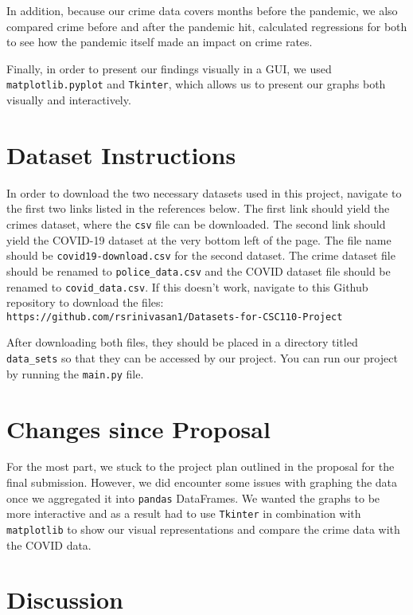 \documentclass[fontsize=11pt]{article}
\begin{document}
In addition, because our crime data covers months before the pandemic, we also compared crime before and after the pandemic hit, calculated regressions for both to see how the pandemic itself made an impact on crime rates.

Finally, in order to present our findings visually in a GUI, we used \verb+matplotlib.pyplot+ and \verb+Tkinter+, which allows us to present our graphs both visually and interactively.

\section{Dataset Instructions}

In order to download the two necessary datasets used in this project, navigate to the first two links listed in the references below. The first link should yield the crimes dataset, where the \verb+csv+ file can be downloaded. The second link should yield the COVID-19 dataset at the very bottom left of the page. The file name should be \verb+covid19-download.csv+ for the second dataset. The crime dataset file should be renamed to \verb+police_data.csv+ and the COVID dataset file should be renamed to \verb+covid_data.csv+. If this doesn’t work, navigate to this Github repository to download the files:\\ \verb+https://github.com/rsrinivasan1/Datasets-for-CSC110-Project+

After downloading both files, they should be placed in a directory titled \verb+data_sets+ so that they can be accessed by our project. You can run our project by running the \verb+main.py+ file.

\section{Changes since Proposal}
For the most part, we stuck to the project plan outlined in the proposal for the final submission. However, we did encounter some issues with graphing the data once we aggregated it into \verb+pandas+ DataFrames. We wanted the graphs to be more interactive and as a result had to use \verb+Tkinter+ in combination with \verb+matplotlib+ to show our visual representations and compare the crime data with the COVID data.

\section{Discussion}
\end{document}
